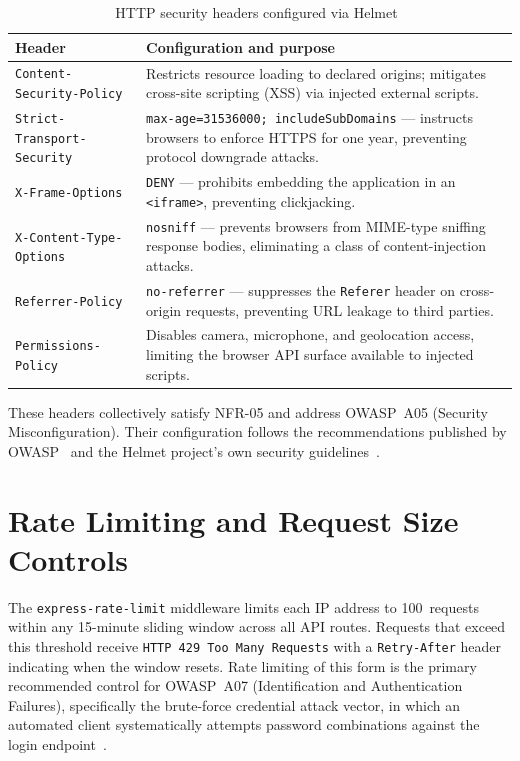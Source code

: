 \begin{table}[H]
  \centering
  \caption{HTTP security headers configured via Helmet~\cite{helmet2023}}
  \label{tab:helmet}
  \begin{tabularx}{\linewidth}{lX}
    \toprule
    \textbf{Header} & \textbf{Configuration and purpose} \\
    \midrule
    \texttt{Content-Security-Policy}       & Restricts resource loading to declared origins; mitigates cross-site scripting (XSS) via injected external scripts. \\
    \texttt{Strict-Transport-Security}     & \texttt{max-age=31536000; includeSubDomains} --- instructs browsers to enforce HTTPS for one year, preventing protocol downgrade attacks. \\
    \texttt{X-Frame-Options}               & \texttt{DENY} --- prohibits embedding the application in an \texttt{<iframe>}, preventing clickjacking. \\
    \texttt{X-Content-Type-Options}        & \texttt{nosniff} --- prevents browsers from MIME-type sniffing response bodies, eliminating a class of content-injection attacks. \\
    \texttt{Referrer-Policy}               & \texttt{no-referrer} --- suppresses the \texttt{Referer} header on cross-origin requests, preventing URL leakage to third parties. \\
    \texttt{Permissions-Policy}            & Disables camera, microphone, and geolocation access, limiting the browser API surface available to injected scripts. \\
    \bottomrule
  \end{tabularx}
\end{table}

These headers collectively satisfy NFR-05 and address OWASP~A05 (Security
Misconfiguration). Their configuration follows the recommendations published
by OWASP~\cite{owasp2021} and the Helmet project's own security
guidelines~\cite{helmet2023}.

\section{Rate Limiting and Request Size Controls}
\label{sec:rate_limit}

The \texttt{express-rate-limit} middleware limits each IP address to
100~requests within any 15-minute sliding window across all API routes.
Requests that exceed this threshold receive \texttt{HTTP~429 Too Many
Requests} with a \texttt{Retry-After} header indicating when the window
resets. Rate limiting of this form is the primary recommended control for
OWASP~A07 (Identification and Authentication Failures), specifically the
brute-force credential attack vector, in which an automated client
systematically attempts password combinations against the login
endpoint~\cite{owasp2021}.

